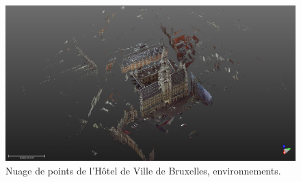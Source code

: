 \documentclass[a4paper,10pt]{scrreprt}
\begin{document}
\begin{figure}[p]
\includegraphics[width=\textwidth]{HotelDeVille_10.png}
\caption{Nuage de points de l'Hôtel de Ville de Bruxelles, environnements.}
\label{fig:bru_townhall_env}
\label{fig:bru_townhall_last}
\end{figure}



\end{document}
